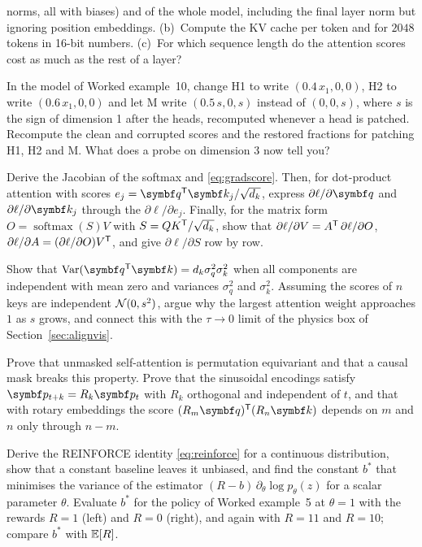 \documentclass[11pt]{article}
\newcommand{\qv}{\vect{q}}
\newcommand{\kv}{\vect{k}}
\newcommand{\pv}{\vect{p}}
\newcommand{\softmax}{\operatorname{softmax}}
\begin{document}
\begin{questions}
\begin{calculations}
  norms, all with biases) and of the whole model, including the final layer norm but ignoring position embeddings. (b)~Compute the KV cache per token and for $2048$ tokens in
  16-bit numbers. (c)~For which sequence length do the attention scores cost as much as the rest of a layer?
\item In the model of Worked example~10, change H1 to write $(0.4\,x_1, 0, 0)$, H2 to write $(0.6\,x_1, 0, 0)$ and let M
  write $(0.5\,s, 0, s)$ instead of $(0, 0, s)$, where $s$ is the sign of dimension 1 after the heads, recomputed whenever a
  head is patched. Recompute the clean and corrupted scores and the restored fractions for
  patching H1, H2 and M. What does a probe on dimension 3 now tell you?
\end{calculations}

\begin{derivations}
\item Derive the Jacobian of the softmax and \eqref{eq:gradscore}. Then, for dot-product attention with scores
  $e_j = \qv\T\kv_j/\sqrt{d_k}$, express $\partial\ell/\partial\qv$ and $\partial\ell/\partial\kv_j$ through the
  $\partial\ell/\partial e_j$. Finally, for the matrix form $O = \softmax(S)V$ with $S = QK^{\mathsf{T}}/\sqrt{d_k}$, show that
  $\partial\ell/\partial V = A^{\mathsf{T}}\,\partial\ell/\partial O$, $\partial\ell/\partial A = (\partial\ell/\partial O)V^{\mathsf{T}}$, and
  give $\partial\ell/\partial S$ row by row.
\item Show that $\Var(\qv\T\kv) = d_k\sigma_q^2\sigma_k^2$ when all components are independent with mean zero and variances
  $\sigma_q^2$ and $\sigma_k^2$. Assuming the scores of $n$ keys are independent $\mathcal{N}(0, s^2)$, argue why the largest
  attention weight approaches $1$ as $s$ grows, and connect this with the $\tau \to 0$ limit of the physics box of
  Section~\ref{sec:alignvis}.
\item Prove that unmasked self-attention is permutation equivariant and that a causal mask breaks this property. Prove that
  the sinusoidal encodings satisfy $\pv_{t+k} = R_k\pv_t$ with $R_k$ orthogonal and independent of $t$, and that with rotary
  embeddings the score $(R_m\qv)\T(R_n\kv)$ depends on $m$ and $n$ only through $n - m$.
\item Derive the REINFORCE identity \eqref{eq:reinforce} for a continuous distribution, show that a constant baseline leaves it
  unbiased, and find the constant $b^*$ that minimises the variance of the estimator $(R - b)\,\partial_\theta\log p_\theta(z)$
  for a scalar parameter $\theta$. Evaluate $b^*$ for the policy of Worked example~5 at $\theta = 1$ with the rewards
  $R = 1$ (left) and $R = 0$ (right), and again with $R = 11$ and $R = 10$; compare $b^*$ with $\mathbb{E}[R]$.
\end{derivations}


\end{questions}
\end{document}
